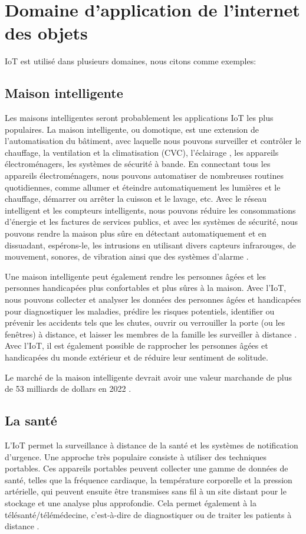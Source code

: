 \section{Domaine d’application de l’internet des objets }
IoT est utilisé dans plusieurs domaines, nous citons comme exemples:
\subsection{Maison intelligente}
Les maisons intelligentes \cite{geneiatakis2017security} seront probablement les applications IoT les plus populaires. La maison intelligente, ou domotique, est une extension de l'automatisation du bâtiment, avec laquelle nous pouvons surveiller et contrôler le chauffage, la ventilation et la climatisation (CVC), l'éclairage \cite{yamamoto2012using}, les appareils électroménagers, les systèmes de sécurité à bande. En connectant tous les appareils électroménagers, nous pouvons automatiser de nombreuses routines quotidiennes, comme allumer et éteindre automatiquement les lumières et le chauffage, démarrer ou arrêter la cuisson et le lavage, etc. Avec le réseau intelligent et les compteurs intelligents, nous pouvons réduire les consommations d'énergie et les factures de services publics, et avec les systèmes de sécurité, nous pouvons rendre la maison plus sûre en détectant automatiquement et en dissuadant, espérons-le, les intrusions en utilisant divers capteurs infrarouges, de mouvement, sonores, de vibration ainsi que des systèmes d'alarme \cite{kodali2016iot}.


Une maison intelligente peut également rendre les personnes âgées et les personnes handicapées plus confortables et plus sûres à la maison. Avec l'IoT, nous pouvons collecter et analyser les données des personnes âgées et handicapées pour diagnostiquer les maladies, prédire les risques potentiels, identifier ou prévenir les accidents tels que les chutes, ouvrir ou verrouiller la porte (ou les fenêtres) à distance, et laisser les membres de la famille les surveiller à distance \cite{kodali2016iot}. Avec l'IoT, il est également possible de rapprocher les personnes âgées et handicapées du monde extérieur et de réduire leur sentiment de solitude.


Le marché de la maison intelligente devrait avoir une valeur marchande de plus de 53 milliards de dollars en 2022 \cite{sovacool2020smart,zhao2020analysis}.

\subsection{La santé}
L'IoT permet la surveillance à distance de la santé et les systèmes de notification d'urgence. Une approche très populaire consiste à utiliser des techniques portables. Ces appareils portables peuvent collecter une gamme de données de santé, telles que la fréquence cardiaque, la température corporelle et la pression artérielle, qui peuvent ensuite être transmises sans fil à un site distant pour le stockage et une analyse plus approfondie. Cela permet également à la télésanté/télémédecine, c'est-à-dire de diagnostiquer ou de traiter les patients à distance \cite{catarinucci2015iot}.
